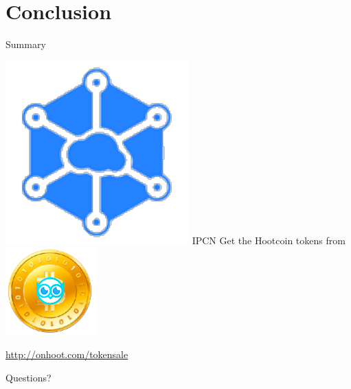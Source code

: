 \documentclass[10pt]{beamer}
\begin{document}
\section{Conclusion}

\begin{frame}{Summary}

\includegraphics[scale=.5]{static/ipcn-p2p}
IPCN Get the Hootcoin tokens from
\includegraphics[scale=0.5]{static/hootcoin} 
 \begin{center}\url{http://onhoot.com/tokensale}\end{center}




 \begin{center}\ccbysa\end{center}

\end{frame}

\begin{frame}[standout]
 Questions?
\end{frame}
\end{document}
